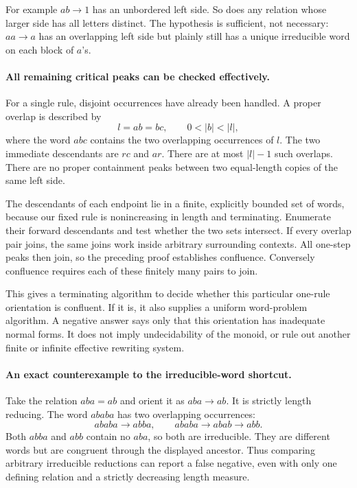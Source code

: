 \documentclass[11pt]{article}
\begin{document}
For example $ab\to1$ has an unbordered left side. So does any relation
whose larger side has all letters distinct. The hypothesis is sufficient,
not necessary: $aa\to a$ has an overlapping left side but plainly still
has a unique irreducible word on each block of $a$'s.

\paragraph{All remaining critical peaks can be checked effectively.}
For a single rule, disjoint occurrences have already been handled.
A proper overlap is described by
\[
 l=ab=bc,\qquad 0<|b|<|l|,
\]
where the word $abc$ contains the two overlapping occurrences of $l$.
The two immediate descendants are $rc$ and $ar$. There are at most
$|l|-1$ such overlaps. There are no proper containment peaks between
two equal-length copies of the same left side.

The descendants of each endpoint lie in a finite, explicitly bounded
set of words, because our fixed rule is nonincreasing in length and
terminating. Enumerate their forward descendants and test whether the
two sets intersect. If every overlap pair joins, the same joins work
inside arbitrary surrounding contexts. All one-step peaks then join,
so the preceding proof establishes confluence. Conversely confluence
requires each of these finitely many pairs to join.

This gives a terminating algorithm to decide whether this particular
one-rule orientation is confluent. If it is, it also supplies a uniform
word-problem algorithm. A negative answer says only that this orientation
has inadequate normal forms. It does not imply undecidability of the
monoid, or rule out another finite or infinite effective rewriting system.

\paragraph{An exact counterexample to the irreducible-word shortcut.}
Take the relation $aba=ab$ and orient it as $aba\to ab$. It is strictly
length reducing. The word $ababa$ has two overlapping occurrences:
\[
 ababa\longrightarrow abba,
 \qquad
 ababa\longrightarrow abab\longrightarrow abb.
\]
Both $abba$ and $abb$ contain no $aba$, so both are irreducible. They
are different words but are congruent through the displayed ancestor.
Thus comparing arbitrary irreducible reductions can report a false
negative, even with only one defining relation and a strictly decreasing
length measure.
\end{document}
